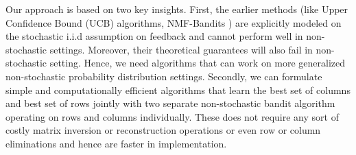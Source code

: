 
Our approach is based on two key insights. First, the earlier methods (like Upper Confidence Bound (UCB) algorithms, NMF-Bandits \citep{sen2016contextual}) are explicitly modeled on the stochastic i.i.d assumption on feedback and cannot perform well in non-stochastic settings. Moreover, their theoretical guarantees will also fail in non-stochastic setting. Hence, we need algorithms that can work on more generalized non-stochastic probability distribution settings. Secondly, we can formulate simple and computationally efficient algorithms that learn the best set of columns and best set of rows jointly with two separate non-stochastic bandit algorithm operating on rows and columns individually. These does not require any sort of costly matrix inversion or reconstruction operations or even row or column eliminations and hence are faster in implementation. 


